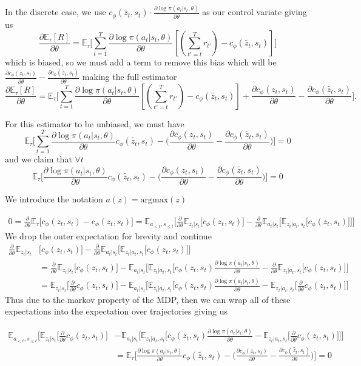 \documentclass{article}
\newcommand{\E}{\mathbb{E}}
\newcommand{\LL}[1]{\frac{\partial \log \pi(a_{#1}| s_{#1}, \theta)}{\partial \theta}}
\newcommand{\PT}{\frac{\partial}{\partial \theta}}
\begin{document}
In the discrete case, we use $c_\phi(\tilde{z_t}, s_t)\cdot \LL{t}$ as our control variate giving us $$\frac{\partial \E_\tau[R]}{\partial \theta} = \E_\tau\Big[\sum_{t=1}^T \LL{t} [(\sum_{t'=t}^T r_{t'}) - c_\phi(\tilde{z_t}, s_t)]\Big]$$ which is biased, so we must add a term to remove this bias which will be $\frac{\partial c_\phi(z_t, s_t)}{\partial\theta} - \frac{\partial c_\phi(\tilde{z_t}, s_t)}{\partial\theta}$ making the full estimator
$$\frac{\partial \E_\tau[R]}{\partial \theta} = \E_\tau\Big[\sum_{t=1}^T \LL{t} [(\sum_{t'=t}^T r_{t'}) - c_\phi(\tilde{z_t}, s_t)] + \frac{\partial c_\phi(z_t, s_t)}{\partial\theta} -  \frac{\partial c_\phi(\tilde{z_t}, s_t)}{\partial\theta}\Big].$$ 

For this estimator to be unbiased, we must have $$\E_\tau\Big[\sum_{t=1}^T \LL{t} c_\phi(\tilde{z_t}, s_t) - \Big(\frac{\partial c_\phi(z_t, s_t)}{\partial\theta} - \frac{\partial c_\phi(\tilde{z_t}, s_t)}{\partial\theta}\Big)\Big] = 0$$ and we claim that $\forall t$  $$\E_\tau\Big[ \LL{t} c_\phi(\tilde{z_t}, s_t) - \Big(\frac{\partial c_\phi(z_t, s_t)}{\partial\theta} - \frac{\partial c_\phi(\tilde{z_t}, s_t)}{\partial\theta}\Big)\Big] = 0$$ 

We introduce the notation $a(z) = \text{argmax}(z)$

\begin{align}
0 = \PT \E_\tau\Big[ c_\phi(z_t, s_t) - c_\phi(z_t, s_t) \Big] = \E_{a_{<t},s_{\leq t}}\Big[ \PT \E_{z_t|s_t} \Big[ c_\phi(z_t, s_t) \Big] -  \PT \E_{a_t|s_t} \Big[ \E_{z_t|a_t, s_t}\Big[ c_\phi(z_t, s_t)\Big] \Big]\Big]
\end{align}
We drop the outer expectation for brevity and continue
\begin{align}
\PT \E_{z_t|s_t} &\Big[ c_\phi(z_t, s_t) \Big] -  \PT \E_{a_t|s_t} \Big[ \E_{z_t|a_t, s_t}\Big[ c_\phi(z_t, s_t)\Big] \Big]\\
&= \PT \E_{z_t|s_t} \Big[ c_\phi(z_t, s_t) \Big] - \E_{a_t|s_t} \Big[ \E_{z_t|a_t, s_t}\Big[c_\phi(z_t, s_t) \LL{t} -\PT \E_{z_t|a_t, s_t}\Big[c_\phi(z_t, s_t)  \Big] \Big]\\
&= \E_{z_t|s_t} \Big[ \PT c_\phi(z_t, s_t) \Big] - \E_{a_t|s_t} \Big[ \E_{z_t|a_t, s_t}\Big[c_\phi(z_t, s_t) \LL{t} - \E_{z_t|a_t, s_t}\Big[\PT c_\phi(z_t, s_t)  \Big] \Big]
\end{align}
Thus due to the markov property of the MDP, then we can wrap all of these expectations into the expectation over trajectories giving us

\begin{align}
\E_{a_{<t},s_{\leq t}}\Big[\E_{z_t|s_t} \Big[ \PT c_\phi(z_t, s_t) \Big] &- \E_{a_t|s_t} \Big[ \E_{z_t|a_t, s_t}\Big[c_\phi(z_t, s_t) \LL{t} - \E_{z_t|a_t, s_t}\Big[\PT c_\phi(z_t, s_t)  \Big] \Big]\Big]\\
&= \E_\tau\Big[ \LL{t} c_\phi(\tilde{z_t}, s_t) - \Big(\frac{\partial c_\phi(z_t, s_t)}{\partial\theta} - \frac{\partial c_\phi(\tilde{z_t}, s_t)}{\partial\theta}\Big)\Big] = 0
\end{align}
\end{document}

